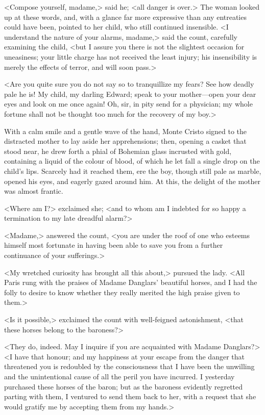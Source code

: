  <Compose yourself, madame,> said he; <all danger is over.> The woman looked up at these words, and, with a glance far more expressive than any entreaties could have been, pointed to her child, who still continued insensible. <I understand the nature of your alarms, madame,> said the count, carefully examining the child, <but I assure you there is not the slightest occasion for uneasiness; your little charge has not received the least injury; his insensibility is merely the effects of terror, and will soon pass.> 

 <Are you quite sure you do not say so to tranquillize my fears? See how deadly pale he is! My child, my darling Edward; speak to your mother—open your dear eyes and look on me once again! Oh, sir, in pity send for a physician; my whole fortune shall not be thought too much for the recovery of my boy.> 

 With a calm smile and a gentle wave of the hand, Monte Cristo signed to the distracted mother to lay aside her apprehensions; then, opening a casket that stood near, he drew forth a phial of Bohemian glass incrusted with gold, containing a liquid of the colour of blood, of which he let fall a single drop on the child's lips. Scarcely had it reached them, ere the boy, though still pale as marble, opened his eyes, and eagerly gazed around him. At this, the delight of the mother was almost frantic. 

 <Where am I?> exclaimed she; <and to whom am I indebted for so happy a termination to my late dreadful alarm?> 

 <Madame,> answered the count, <you are under the roof of one who esteems himself most fortunate in having been able to save you from a further continuance of your sufferings.> 

 <My wretched curiosity has brought all this about,> pursued the lady. <All Paris rung with the praises of Madame Danglars' beautiful horses, and I had the folly to desire to know whether they really merited the high praise given to them.> 

 <Is it possible,> exclaimed the count with well-feigned astonishment, <that these horses belong to the baroness?> 

 <They do, indeed. May I inquire if you are acquainted with Madame Danglars?>  <I have that honour; and my happiness at your escape from the danger that threatened you is redoubled by the consciousness that I have been the unwilling and the unintentional cause of all the peril you have incurred. I yesterday purchased these horses of the baron; but as the baroness evidently regretted parting with them, I ventured to send them back to her, with a request that she would gratify me by accepting them from my hands.> 

